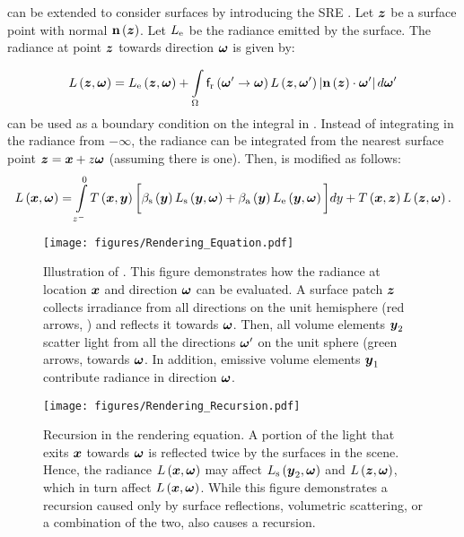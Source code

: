 \documentclass{article}
\begin{document}
\eq{\ref{eq:integrated_RTE}} can be extended to consider surfaces by introducing the \ac{SRE} \citep{kajiya1986rendering}. Let $\boldsymbol{z}$ be a surface point with normal $\textbf{n}\left({\boldsymbol{z}}\right)$. Let $L_{\text{e}}$ be the radiance emitted by the surface. The radiance at point $\boldsymbol{z}$ towards direction $\boldsymbol{\omega}$ is given by:
 
\begin{equation}
\label{eq:surface_rendering}
\radiance\regpar{\locationc,\direction} = \radiancee\regpar{\locationc,\direction} +  \intop_{\hemisphere}{\brdf\regpar{\direction'\rightarrow\direction}\radiance\regpar{\locationc,\direction'}\abs{\normal\regpar{\locationc}\cdot\direction'}d\direction'}
\end{equation}
\eq{\ref{eq:surface_rendering}} can be used as a boundary condition on the integral in \eq{\ref{eq:integrated_RTE}}. Instead of integrating in \eq{\ref{eq:integrated_RTE}} the radiance from $-\infty$, the radiance can be integrated from the nearest surface point $\boldsymbol{z}=\boldsymbol{x}+z\boldsymbol{\omega}$ (assuming there is one). Then, \eq{\ref{eq:integrated_RTE}} is modified as follows: 
\begin{equation}
\label{eq:volume_rendering}
\radianceat = \intop_{\locc^{-}}^0{\trans{\location}{\locationb}\bigg[\exts\regpar{\locationb}\radiances\regpar{\locationb,\direction}} + \exta\regpar{\locationb}\radiancee\regpar{\locationb,\direction} \bigg]d\locb +
\trans{\location}{\locationc}\radiance\regpar{\locationc,\direction}.
\end{equation} 

\begin{figure}[t]
  \centering
  \texttt{[image: figures/Rendering\_Equation.pdf]}
    \caption{Illustration of \eq{\ref{eq:volume_rendering}}. This figure demonstrates how the radiance at location $\boldsymbol{x}$ and direction $\boldsymbol{\omega}$ can be evaluated. A surface patch $\boldsymbol{z}$ collects irradiance from all directions on the unit hemisphere  (red arrows, \eqnopar{\ref{eq:surface_rendering}}) and reflects it towards $\boldsymbol{\omega}$. Then, all volume elements $\boldsymbol{y}_2$ scatter light from all the directions $\boldsymbol{\omega}'$ on the unit sphere (green arrows, \eqnopar{\ref{eq:inscattered_radiance})} towards $\boldsymbol{\omega}$. In addition, emissive volume elements $\boldsymbol{y}_1$ contribute radiance in direction $\boldsymbol{\omega}$.}
    \label{fig:volume_rendering}
\end{figure}

\begin{figure}[t]
  \centering
  \texttt{[image: figures/Rendering\_Recursion.pdf]}
    \caption{Recursion in the rendering equation. A portion of the light that exits $\boldsymbol{x}$ towards $\boldsymbol{\omega}$ is reflected twice by the surfaces in the scene. Hence, the radiance $L\left({\boldsymbol{x},\boldsymbol{\omega}}\right)$ may affect $L_{\text{s}}\left({\boldsymbol{y}_2,\boldsymbol{\omega}}\right)$ and $L\left({\boldsymbol{z},\boldsymbol{\omega}}\right)$, which in turn affect $L\left({\boldsymbol{x},\boldsymbol{\omega}}\right)$.
    While this figure demonstrates a recursion caused only by surface reflections, volumetric scattering, or a combination of the two, also causes a recursion.}  
    \label{fig:volume_recursion}
\end{figure}
\end{document}
